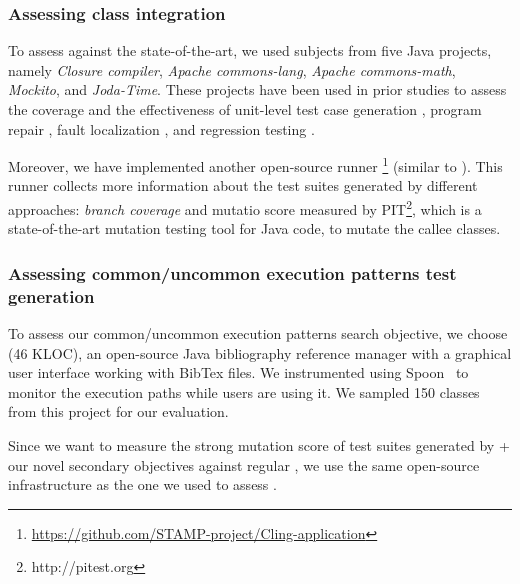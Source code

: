 \subsubsection{Assessing class integration} 
To assess \cling against the state-of-the-art, we used subjects from five Java projects, namely \textit{Closure compiler}, \textit{Apache commons-lang}, \textit{Apache commons-math}, \textit{Mockito}, and \textit{Joda-Time}. These 
projects have been used in prior studies to assess the coverage and the effectiveness of unit-level test case generation \cite{ma2015grt, Panichella2018, just2014defects4j, Shamshiri2016}, program repair \cite{smith2015cure, martinez2016astor}, fault localization \cite{pearson2017evaluating, b2016learning}, and regression testing \cite{noor2015similarity, lu2016does}.

Moreover, we have implemented another open-source runner \footnote{\url{https://github.com/STAMP-project/Cling-application}} (similar to \exrunner). This runner collects more information about the test suites generated by different approaches: \textit{branch coverage} and mutatio score measured by PIT\footnote{http://pitest.org}, which is a state-of-the-art mutation testing tool for Java code, to mutate the callee classes.

\subsubsection{Assessing common/uncommon execution patterns test generation} 

To assess our common/uncommon execution patterns search objective, we choose \jabref (46 KLOC), an open-source Java bibliography reference manager with a graphical user interface working with BibTex files. We instrumented \jabref using Spoon~\cite{pawlak:hal-01169705} to monitor the execution paths while users are using it. We sampled 150 classes from this project for our evaluation.

Since we want to measure the strong mutation score of test suites generated by \evosuite + our novel secondary objectives against regular \evosuite, we use the same open-source infrastructure as the one we used to assess \cling.



